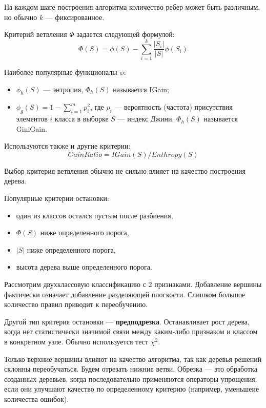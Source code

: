 На каждом шаге построения алгоритма количество ребер может быть различным, но
обычно $k$ --- фиксированное.

Критерий ветвления $\Phi$ задается следующей формулой:
\[
    \Phi(S) = \phi(S) - \sum_{i=1}^k \frac{|S_i|}{|S|}\phi(S_i)
\]

Наиболее популярные функционалы $\phi$:
\begin{itemize}
    \item $\phi_h(S)$ --- энтропия, $\Phi_h(S)$ называется IGain;

    \item $\phi_g(S) = 1 - \sum_{i=1}^m p_i^2$, где $p_i$ --- вероятность
        (частота) присутствия элементов $i$ класса в выборке $S$ --- индекс
        Джини. $\Phi_h(S)$ называется GiniGain.
\end{itemize}

Используются также и другие критерии:
\[
    GainRatio = IGain(S) / Enthropy(S)
\]

Выбор критерия ветвления обычно не сильно влияет на качество построения дерева.

Популярные критерии остановки:
\begin{itemize}
    \item один из классов остался пустым после разбиения,
        
    \item $\Phi(S)$ ниже определенного порога,

    \item $|S|$ ниже определенного порога,

    \item высота дерева выше определенного порога.
\end{itemize}

Рассмотрим двухклассовую классификацию с 2 признаками. Добавление вершины
фактически означает добавление разделяющей плоскости. Слишком большое
количество правил приводит к переобучению.


Другой тип критерия остановки --- \textbf{предподрезка}. Останавливает рост
дерева, когда нет статистически значимой связи между каким-либо признаком и
классом в конкретном узле. Обычно используется тест $\chi^2$.

Только верхние вершины влияют на качество алгоритма, так как деревья решений
склонны переобучаться. Будем отрезать нижние ветви. Обрезка --- это обработка
созданных деревьев, когда последовательно применяются операторы упрощения, если
они улучшают качество по определенному критерию (например, уменьшеие количества
ошибок).

